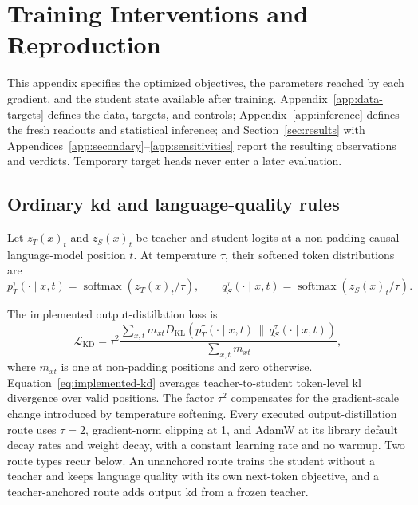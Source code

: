 \section{Training Interventions and Reproduction}
\label{app:training}

This appendix specifies the optimized objectives, the parameters reached by each gradient, and the student state available after training.
Appendix~\ref{app:data-targets} defines the data, targets, and controls; Appendix~\ref{app:inference} defines the fresh readouts and statistical inference; and Section~\ref{sec:results} with Appendices~\ref{app:secondary}--\ref{app:sensitivities} report the resulting observations and verdicts.
Temporary target heads never enter a later evaluation.

\subsection{Ordinary \ac{kd} and language-quality rules}

Let \(z_T(x)_t\) and \(z_S(x)_t\) be teacher and student logits at a non-padding causal-language-model position \(t\).
At temperature \(\tau\), their softened token distributions are
\[
  p_T^\tau(\cdot\mid x,t)
  =\operatorname{softmax}\!\left(z_T(x)_t/\tau\right),
  \qquad
  q_S^\tau(\cdot\mid x,t)
  =\operatorname{softmax}\!\left(z_S(x)_t/\tau\right).
\]
\begin{samepage}
The implemented output-distillation loss is
\begin{equation}
  \mathcal L_{\mathrm{KD}}
  =
  \tau^2
  \frac{
    \sum_{x,t}m_{xt}
    D_{\mathrm{KL}}\!\left(
      p_T^\tau(\cdot\mid x,t)
      \,\|\,
      q_S^\tau(\cdot\mid x,t)
    \right)
  }{
    \sum_{x,t}m_{xt}
  },
  \label{eq:implemented-kd}
\end{equation}
where \(m_{xt}\) is one at non-padding positions and zero otherwise.
Equation~\ref{eq:implemented-kd} averages teacher-to-student token-level \ac{kl} divergence over valid positions.
The factor \(\tau^2\) compensates for the gradient-scale change introduced by temperature softening.
Every executed output-distillation route uses \(\tau=2\), gradient-norm clipping at 1, and AdamW at its library default decay rates and weight decay, with a constant learning rate and no warmup.
Two route types recur below.
An unanchored route trains the student without a teacher and keeps language quality with its own next-token objective, and a teacher-anchored route adds output \ac{kd} from a frozen teacher. 
\end{samepage}


